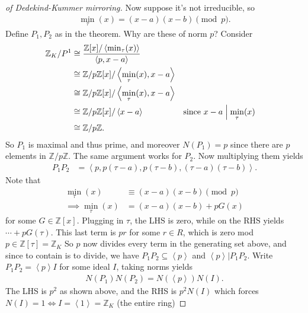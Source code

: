 \begin{proof}[of Dedekind-Kummer mirroring]
Now suppose it's not irreducible, so
\begin{align*}
\min_\tau(x) = (x-a)(x-b) \pmod p
.\end{align*}
Define \(P_1, P_2\) as in the theorem. Why are these of norm \(p\)?
Consider
\begin{align*}
{\mathbb{Z}}_K/P^1 
&\cong { {\mathbb{Z}}[x] / \left\langle{ \min_\tau(x) }\right\rangle \over \left\langle{ p, x-a }\right\rangle } \\
&\cong {\mathbb{Z}}/p{\mathbb{Z}}[x] / \left\langle{ \min_\tau(x), x-a}\right\rangle \\
&\cong {\mathbb{Z}}/p{\mathbb{Z}}[x] / \left\langle{ \min_\tau(x), x-a}\right\rangle \\
&\cong {\mathbb{Z}}/p{\mathbb{Z}}[x] / \left\langle{ x-a}\right\rangle && \text{since } x-a \mathrel{\Big|}\min_\tau(x)\\
&\cong {\mathbb{Z}}/p{\mathbb{Z}}
.\end{align*}
So \(P_1\) is maximal and thus prime, and moreover \(N(P_1) = p\) since
there are \(p\) elements in \({\mathbb{Z}}/p{\mathbb{Z}}\). The same
argument works for \(P_2\). Now multiplying them yields
\begin{align*}
P_1 P_2 
&= \left\langle{ p, p(\tau - a), p (\tau - b), (\tau -a)(\tau -b) }\right\rangle
.\end{align*}
Note that
\begin{align*}
\min_\tau(x) &\equiv (x-a)(x-b) \pmod p \\
\implies
\min_\tau(x) &= (x-a)(x-b) + pG(x)
\end{align*}
for some \(G\in {\mathbb{Z}}[x]\). Plugging in \(\tau\), the LHS is
zero, while on the RHS yields \(\cdots + pG(\tau)\). This last term is
\(pr\) for some \(r\in R\), which is zero mod
\(p \in {\mathbb{Z}}[\tau] = {\mathbb{Z}}_K\) So \(p\) now divides every
term in the generating set above, and since to contain is to divide, we
have \(P_1 P_2 \subseteq \left\langle{ p }\right\rangle\) and
\(\left\langle{ p }\right\rangle \mathrel{\Big|}P_1 P_2\). Write
\(P_1 P_2 = \left\langle{ p }\right\rangle I\) for some ideal \(I\),
taking norms yields
\begin{align*}
N(P_1) N(P_2) = N( \left\langle{ p }\right\rangle) N(I) 
.\end{align*}
The LHS is \(p^2\) as shown above, and the RHS is \(p^2 N(I)\) which
forces
\(N(I) = 1 \iff I = \left\langle{ 1 }\right\rangle = {\mathbb{Z}}_K\)
(the entire ring)

\hfill\break


\end{proof}
